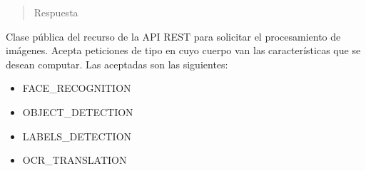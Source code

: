 \begin{fulllineitems}
\begin{fulllineitems}
\begin{fulllineitems}
\begin{sphinxVerbatim}[commandchars=\\\{\}]
    
    
\end{sphinxVerbatim}
\begin{quote}\begin{description}
\item[{Respuesta}] \leavevmode
\end{description}\end{quote}

\begin{sphinxVerbatim}[commandchars=\\\{\}]
    
\end{sphinxVerbatim}

\end{fulllineitems}


\end{fulllineitems}

\label{\detokenize{chapter_two/desc_cloudnao:module-app.resources.vision}}\label{\detokenize{chapter_two/desc_cloudnao:module-vision}}

\begin{fulllineitems}
\label{\detokenize{chapter_two/desc_cloudnao:app.resources.vision.Vision}}
Clase pública del recurso de la API REST para solicitar el procesamiento
de imágenes. Acepta peticiones de tipo  en cuyo cuerpo van las
características que se desean computar. Las aceptadas son las siguientes:
\begin{itemize}
\item {} 
FACE\_RECOGNITION

\item {} 
OBJECT\_DETECTION

\item {} 
LABELS\_DETECTION

\item {} 
OCR\_TRANSLATION


\end{itemize}
\end{fulllineitems}
\end{fulllineitems}
